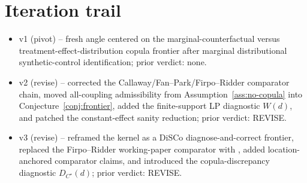 \documentclass[11pt]{article}
\theoremstyle{definition}
\theoremstyle{plain}
\theoremstyle{remark}
\begin{document}
\section{Iteration trail}
\begin{itemize}[leftmargin=*]
\item v1 (pivot) -- fresh angle centered on the marginal-counterfactual versus treatment-effect-distribution copula frontier after marginal distributional synthetic-control identification; prior verdict: none.
\item v2 (revise) -- corrected the Callaway/Fan--Park/Firpo--Ridder comparator chain, moved all-coupling admissibility from Assumption~\ref{ass:no-copula} into Conjecture~\ref{conj:frontier}, added the finite-support LP diagnostic \(W(d)\), and patched the constant-effect sanity reduction; prior verdict: REVISE.
\item v3 (revise) -- reframed the kernel as a DiSCo diagnose-and-correct frontier, replaced the Firpo--Ridder working-paper comparator with \cite{FirpoRidder2019Functionals}, added location-anchored comparator claims, and introduced the copula-discrepancy diagnostic \(D_{C^\star}(d)\); prior verdict: REVISE.
\end{itemize}
\end{document}
